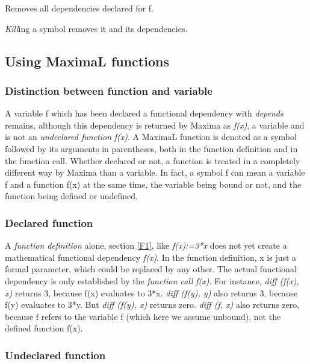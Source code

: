 \documentclass[../Maxima_Workbook.tex]{subfiles}
\begin{document}
\lz \lzz {} \hfill \tcr{[function]}

\lz Removes all dependencies declared for f.

\lz \emph{Kill}ing a symbol removes it and its dependencies.

\subsection{Using MaximaL functions}

\subsubsection{Distinction between function and variable}\label{D4a}

A variable f which has been declared a functional dependency with \emph{depends} remains, although this dependency is returned by Maxima as \emph{f(x)}, a variable and is not an \emph{undeclared function} \emph{f(x)}. A MaximaL function is denoted as a symbol followed by its arguments in parentheses, both in the function definition and in the function call. Whether declared or not, a function is treated in a completely different way by Maxima than a variable. In fact, a symbol f can mean a variable f and a function f(x) at the same time, the variable being bound or not, and the function being defined or undefined.

\subsubsection{Declared function}

A \emph{function definition} alone, section \ref{F1}, like \emph{f(x):=3*x} does not yet create a mathematical functional dependency \emph{f(x)}. In the function definition, x is just a formal parameter, which could be replaced by any other. The actual functional dependency is only established by the \emph{function call} \emph{f(x)}. For instance, \emph{diff (f(x), x)} returns 3, because f(x) evaluates to 3*x. \emph{diff (f(y), y)} also returns 3, because f(y) evaluates to 3*y. But \emph{diff (f(y), x)} returns zero. \emph{diff (f, x)} also returns zero, because f refers to the variable f (which here we assume unbound), not the defined function f(x). 

\subsubsection{Undeclared function}
\end{document}
